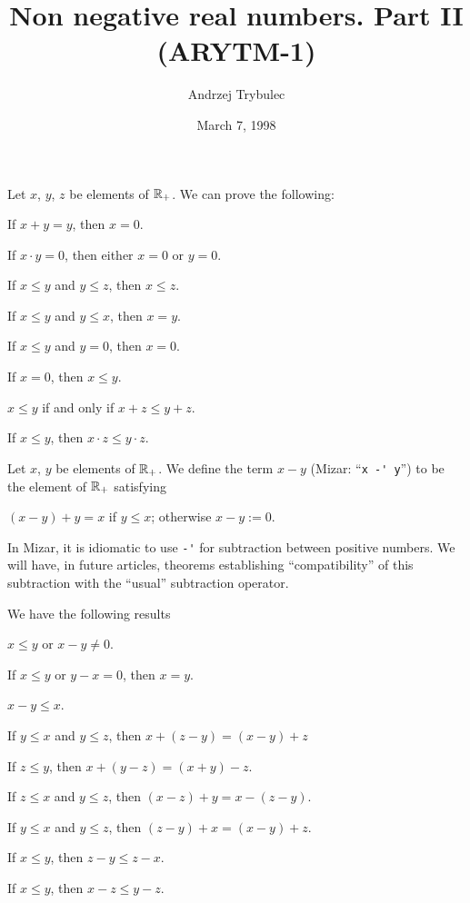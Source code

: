 \documentclass{article}
\title{Non negative real numbers. Part II (ARYTM-1)}
\author{Andrzej Trybulec}
\date{March 7, 1998}
\begin{document}
\maketitle

Let $x$, $y$, $z$ be elements of $\mathbb{R}_{+}$. We can prove the following:
\begin{thm}
\item\label{arytm1:1} If $x+y=y$, then $x=0$.
\item\label{arytm1:2} If $x\cdot y=0$, then either $x=0$ or $y=0$.
\item\label{arytm1:3} If $x\leq y$ and $y\leq z$, then $x\leq z$.
\item\label{arytm1:4} If $x\leq y$ and $y\leq x$, then $x=y$.
\item\label{arytm1:5} If $x\leq y$ and $y=0$, then $x=0$.
\item\label{arytm1:6} If $x=0$, then $x\leq y$.
\item\label{arytm1:7} $x\leq y$ if and only if $x+z\leq y+z$.
\item\label{arytm1:8} If $x\leq y$, then $x\cdot z\leq y\cdot z$.
\end{thm}

\begin{definition}\index{\texttt{-\textquotesingle}}%
Let $x$, $y$ be elements of $\mathbb{R}_{+}$.
We define the term $x-y$ (Mizar: ``\verb#x -' y#'') to be the element of
$\mathbb{R}_{+}$ satisfying
\begin{defn}
\item $(x-y)+y=x$ if $y\leq x$; otherwise $x-y:=0$.
\end{defn}
\end{definition}

\begin{remark}
In Mizar, it is idiomatic to use \verb#-'# for subtraction between
positive numbers. We will have, in future articles, theorems
establishing ``compatibility'' of this subtraction with the ``usual''
subtraction operator. 
\end{remark}

We have the following results
\begin{thm}
\item\label{arytm1:9} $x\leq y$ or $x - y\neq0$.
\item\label{arytm1:10} If $x\leq y$ or $y-x=0$, then $x=y$.
\item\label{arytm1:11} $x - y\leq x$.
\item\label{arytm1:12} If $y\leq x$ and $y\leq z$, then $x+(z-y)=(x-y)+z$
\item\label{arytm1:13} If $z\leq y$, then $x + (y - z) = (x + y) - z$.
\item\label{arytm1:14} If $z\leq x$ and $y\leq z$, then $(x - z)+y=x-(z-y)$.
\item\label{arytm1:15} If $y\leq x$ and $y\leq z$, then $(z - y)+x=(x-y)+z$.
\item\label{arytm1:16} If $x\leq y$, then $z-y\leq z-x$.
\item\label{arytm1:17} If $x\leq y$, then $x-z\leq y-z$.
\end{thm}
\end{document}
